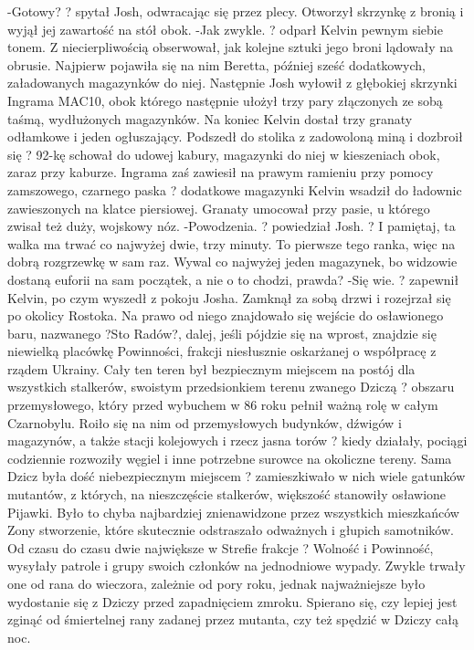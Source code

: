 \documentclass[../MAIN.tex]{subfiles}
\begin{document}
-Gotowy? ? spytał Josh, odwracając się przez plecy. Otworzył skrzynkę z bronią i wyjął jej zawartość na stół obok.
-Jak zwykle. ? odparł Kelvin pewnym siebie tonem. Z niecierpliwością obserwował, jak kolejne sztuki jego broni lądowały na obrusie. Najpierw pojawiła się na nim Beretta, później sześć dodatkowych, załadowanych magazynków do niej. Następnie Josh wyłowił z głębokiej skrzynki Ingrama MAC10, obok którego następnie ułożył trzy pary złączonych ze sobą taśmą, wydłużonych magazynków.
Na koniec Kelvin dostał trzy granaty odłamkowe i jeden ogłuszający.
Podszedł do stolika z zadowoloną miną i dozbroił się ? 92-kę schował do udowej kabury, magazynki do niej w kieszeniach obok, zaraz przy kaburze. Ingrama zaś zawiesił na prawym ramieniu przy pomocy zamszowego, czarnego paska ? dodatkowe magazynki Kelvin wsadził do ładownic zawieszonych na klatce piersiowej. Granaty umocował przy pasie, u którego zwisał też duży, wojskowy nóz.
-Powodzenia. ? powiedział Josh. ? I pamiętaj, ta walka ma trwać co najwyżej dwie, trzy minuty. To pierwsze tego ranka, więc na dobrą rozgrzewkę w sam raz. Wywal co najwyżej jeden magazynek, bo widzowie dostaną euforii na sam początek, a nie o to chodzi, prawda?
-Się wie. ? zapewnił Kelvin, po czym wyszedł z pokoju Josha.
Zamknął za sobą drzwi i rozejrzał się po okolicy Rostoka. Na prawo od niego znajdowało się wejście do osławionego baru, nazwanego ?Sto Radów?, dalej, jeśli pójdzie się na wprost, znajdzie się niewielką placówkę Powinności, frakcji niesłusznie oskarżanej o współpracę z rządem Ukrainy.
Cały ten teren był bezpiecznym miejscem na postój dla wszystkich stalkerów, swoistym przedsionkiem terenu zwanego Dziczą ? obszaru przemysłowego, który przed wybuchem w 86 roku pełnił ważną rolę w całym Czarnobylu. Roiło się na nim od przemysłowych budynków, dźwigów i magazynów, a także stacji kolejowych i rzecz jasna torów ? kiedy działały, pociągi codziennie rozwoziły węgiel i inne potrzebne surowce na okoliczne tereny.
Sama Dzicz była dość niebezpiecznym miejscem ? zamieszkiwało w nich wiele gatunków mutantów, z których, na nieszczęście stalkerów, większość stanowiły osławione Pijawki. Było to chyba najbardziej znienawidzone przez wszystkich mieszkańców Zony stworzenie, które skutecznie odstraszało odważnych i głupich samotników.
Od czasu do czasu dwie największe w Strefie frakcje ? Wolność i Powinność, wysyłały patrole i grupy swoich członków na jednodniowe wypady. Zwykle trwały one od rana do wieczora, zależnie od pory roku, jednak najważniejsze było wydostanie się z Dziczy przed zapadnięciem zmroku.
Spierano się, czy lepiej jest zginąć od śmiertelnej rany zadanej przez mutanta, czy też spędzić w Dziczy całą noc.
\end{document}
